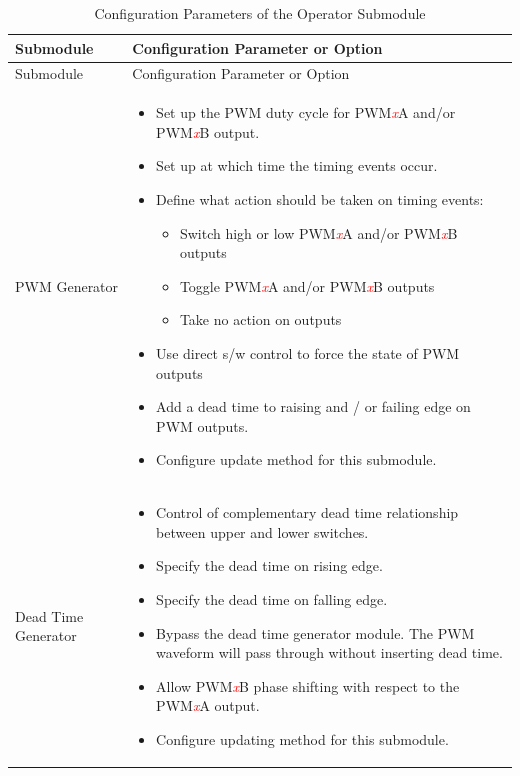 \begin{longtable}[c]{|m{5cm}|m{10cm}|}
\caption{Configuration Parameters of the Operator Submodule}
\label{table:para_sub_operator}
    \\\hline
    \rowcolor{lightgray}
   Submodule & Configuration Parameter or Option \\ \hline 

\endfirsthead\hline
 \rowcolor{lightgray}
   Submodule & Configuration Parameter or Option \\
 \hline 
\endhead
\endfoot
    PWM Generator &\vspace{-1em}
    \begin{itemize}
        \item Set up the PWM duty cycle for PWM\textcolor{red}{\it{x}}A and/or PWM\textcolor{red}{\it{x}}B output.
        \item Set up at which time the timing events occur.
        \item Define what action should be taken on timing events:
        \begin{itemize}
           \item Switch high or low PWM\textcolor{red}{\it{x}}A and/or PWM\textcolor{red}{\it{x}}B outputs
           \item Toggle PWM\textcolor{red}{\it{x}}A and/or PWM\textcolor{red}{\it{x}}B outputs
           \item Take no action on outputs
        \end{itemize}
        \item Use direct s/w control to force the state of PWM outputs
        \item Add a dead time to raising and / or failing edge on PWM outputs.
        \item Configure update method for this submodule.\vspace{-1em}
    \end{itemize}\\\hline
    
    Dead Time Generator &\vspace{-1em}
    \begin{itemize}
        \item Control of complementary dead time relationship between upper and lower switches.
        \item Specify the dead time on rising edge.
        \item Specify the dead time on falling edge.
        \item Bypass the dead time generator module. The PWM waveform will pass through without inserting dead time.
        \item Allow PWM\textcolor{red}{\it{x}}B phase shifting with respect to the PWM\textcolor{red}{\it{x}}A output.
        \item Configure updating method for this submodule.\vspace{-1em}
    \end{itemize}\\\hline
    

\end{longtable}
